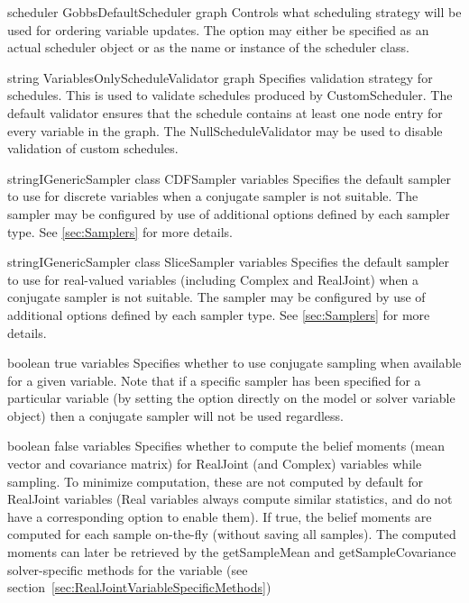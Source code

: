 
{scheduler}
{GobbsDefaultScheduler}
{graph}
{Controls what scheduling strategy will be used for ordering variable updates. The option may either be specified as an actual scheduler object or as the name or instance of the scheduler class.}


{string}
{VariablesOnlyScheduleValidator}
{graph}
{Specifies validation strategy for schedules. This is used to validate schedules produced by CustomScheduler. The default validator ensures that the schedule contains at least one node entry for every variable in the graph. The NullScheduleValidator may be used to disable validation of custom schedules.}


{\ifmatlab string\fi \ifjava IGenericSampler class\fi}
{CDFSampler}
{variables}
{Specifies the default sampler to use for discrete variables when a conjugate sampler is not  suitable. The sampler may be configured by use of additional options defined by each sampler type. See \autoref{sec:Samplers} for more details.}


{\ifmatlab string\fi \ifjava IGenericSampler class\fi}
{SliceSampler}
{variables}
{Specifies the default sampler to use for real-valued variables (including Complex and RealJoint) when a conjugate sampler is not suitable. The sampler may be configured by use of additional options defined by each sampler type. See \autoref{sec:Samplers} for more details.}


{boolean}
{true}
{variables}
{Specifies whether to use conjugate sampling when available for a given variable. Note that if a specific sampler has been specified for a particular variable (by setting the  option directly on the model or solver variable object) then a conjugate sampler will not be used regardless.}


{boolean}
{false}
{variables}
{Specifies whether to compute the belief moments (mean vector and covariance matrix) for RealJoint (and Complex) variables while sampling.  To minimize computation, these are not computed by default for RealJoint variables (Real variables always compute similar statistics, and do not have a corresponding option to enable them).  If true, the belief moments are computed for each sample on-the-fly (without saving all samples).  The computed moments can later be retrieved by the getSampleMean and getSampleCovariance solver-specific methods for the variable (see section~\ref{sec:RealJointVariableSpecificMethods})}



